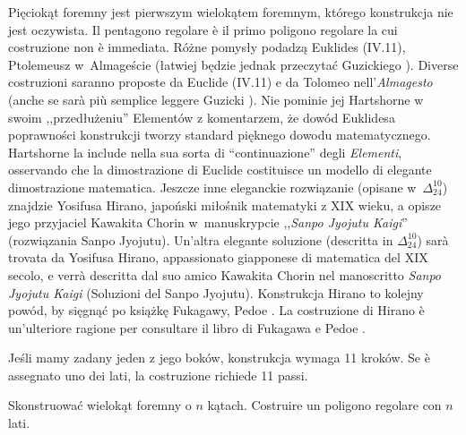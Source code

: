 Pięciokąt foremny jest pierwszym wielokątem foremnym, którego konstrukcja nie jest oczywista. %
Il pentagono regolare è il primo poligono regolare la cui costruzione non è immediata. %
Różne pomysły podadzą Euklides (IV.11), Ptolemeusz w~Almageście (łatwiej będzie jednak przeczytać Guzickiego \cite[s. 286-287]{guzicki_2021}). %
Diverse costruzioni saranno proposte da Euclide (IV.11) e da Tolomeo nell'\emph{Almagesto} (anche se sarà più semplice leggere Guzicki \cite[p. 286-287]{guzicki_2021}). %
%
Nie pominie jej Hartshorne \cite[s. 45-49]{hartshorne_2000} w swoim ,,przedłużeniu'' Elementów z komentarzem, że dowód Euklidesa poprawności konstrukcji tworzy standard pięknego dowodu matematycznego. %
Hartshorne \cite[p. 45-49]{hartshorne_2000} la include nella sua sorta di ``continuazione'' degli \emph{Elementi}, osservando che la dimostrazione di Euclide costituisce un modello di elegante dimostrazione matematica. %
Jeszcze inne eleganckie rozwiązanie (opisane w~$\Delta_{24}^{10}$) znajdzie Yosifusa Hirano, japoński miłośnik matematyki z XIX wieku, a opisze jego przyjaciel Kawakita Chorin w~manuskrypcie ,,\emph{Sanpo Jyojutu Kaigi}'' (rozwiązania Sanpo Jyojutu). %
Un'altra elegante soluzione (descritta in $\Delta_{24}^{10}$) sarà trovata da Yosifusa Hirano, appassionato giapponese di matematica del XIX secolo, e verrà descritta dal suo amico Kawakita Chorin nel manoscritto \emph{Sanpo Jyojutu Kaigi} (Soluzioni del Sanpo Jyojutu). %
%
Konstrukcja Hirano to kolejny powód, by sięgnąć po książkę Fukagawy, Pedoe \cite{fukagawa_1989}. %
La costruzione di Hirano è un'ulteriore ragione per consultare il libro di Fukagawa e Pedoe \cite{fukagawa_1989}. %

Jeśli mamy zadany jeden z jego boków, konstrukcja wymaga 11 kroków. %
Se è assegnato uno dei lati, la costruzione richiede 11 passi. %

\begin{problem}
    Skonstruować wielokąt foremny o $n$ kątach. %
    Costruire un poligono regolare con $n$ lati. %
\end{problem}

